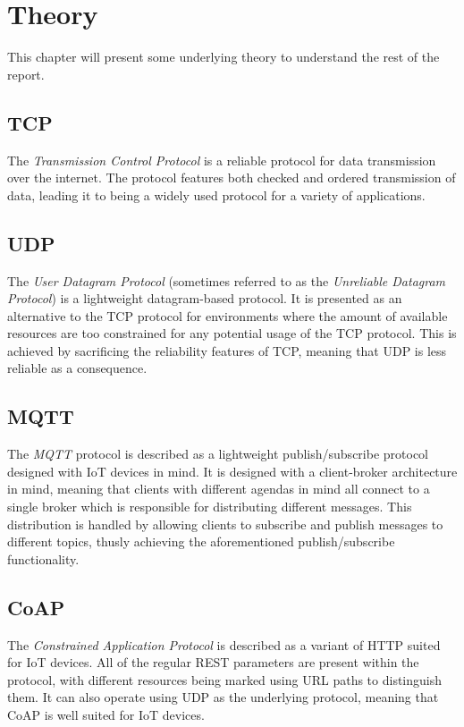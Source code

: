 \section{Theory}
\label{ch:theory}
\noindent

This chapter will present some underlying theory to understand the rest of the report.

\subsection{TCP}

The \textit{Transmission Control Protocol} is a reliable protocol for data transmission over the internet\cite{tcp}. The protocol features both checked and ordered transmission of data, leading it to being a widely used protocol for a variety of applications.

\subsection{UDP}

The \textit{User Datagram Protocol} (sometimes referred to as the \textit{Unreliable Datagram Protocol}) is a lightweight datagram-based protocol\cite{udp}. It is presented as an alternative to the TCP protocol for environments where the amount of available resources are too constrained for any potential usage of the TCP protocol. This is achieved by sacrificing the reliability features of TCP, meaning that UDP is less reliable as a consequence.

\subsection{MQTT}

The \textit{MQTT} protocol is described as a lightweight publish/subscribe protocol designed with IoT devices in mind\cite{mqtt}. It is designed with a client-broker architecture in mind, meaning that clients with different agendas in mind all connect to a single broker which is responsible for distributing different messages. This distribution is handled by allowing clients to subscribe and publish messages to different topics, thusly achieving the aforementioned publish/subscribe functionality.

\subsection{CoAP}

The \textit{Constrained Application Protocol} is described as a variant of HTTP suited for IoT devices\cite{coap}. All of the regular REST parameters are present within the protocol, with different resources being marked using URL paths to distinguish them. It can also operate using UDP as the underlying protocol, meaning that CoAP is well suited for IoT devices.

